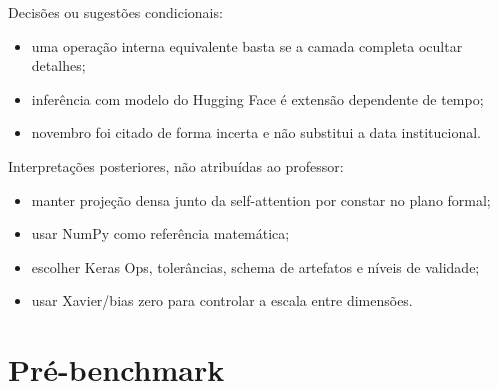 Decisões ou sugestões condicionais:


\begin{itemize}
\item uma operação interna equivalente basta se a camada completa ocultar detalhes;
\item inferência com modelo do Hugging Face é extensão dependente de tempo;
\item novembro foi citado de forma incerta e não substitui a data institucional.
\end{itemize}


Interpretações posteriores, não atribuídas ao professor:


\begin{itemize}
\item manter projeção densa junto da self-attention por constar no plano formal;
\item usar NumPy como referência matemática;
\item escolher Keras Ops, tolerâncias, schema de artefatos e níveis de validade;
\item usar Xavier/bias zero para controlar a escala entre dimensões.
\end{itemize}


\section{Pré-benchmark}



